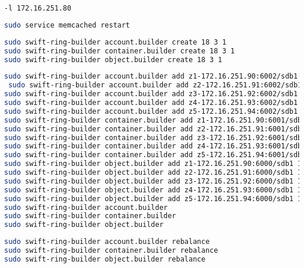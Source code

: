 \begin{lstlisting}[label=memcachedconf, language=Bash, caption=MemCached in /etc/memcached.conf konfigurieren ]
-l 172.16.251.80
\end{lstlisting}

\begin{lstlisting}[label=startMemcached, language=Bash, caption=Memcached starten]
sudo service memcached restart
\end{lstlisting}

\begin{lstlisting}[label=ring_create, language=Bash, caption=Account Container und Object Ring erstellen]
sudo swift-ring-builder account.builder create 18 3 1
sudo swift-ring-builder container.builder create 18 3 1
sudo swift-ring-builder object.builder create 18 3 1
\end{lstlisting}

\begin{lstlisting}[label=ring_add, language=Bash, caption=Server bzw. Speicher den Ringen hinzufügen]
sudo swift-ring-builder account.builder add z1-172.16.251.90:6002/sdb1 100
 sudo swift-ring-builder account.builder add z2-172.16.251.91:6002/sdb1 100
sudo swift-ring-builder account.builder add z3-172.16.251.92:6002/sdb1 100
sudo swift-ring-builder account.builder add z4-172.16.251.93:6002/sdb1 100
sudo swift-ring-builder account.builder add z5-172.16.251.94:6002/sdb1 100
sudo swift-ring-builder container.builder add z1-172.16.251.90:6001/sdb1 100
sudo swift-ring-builder container.builder add z2-172.16.251.91:6001/sdb1 100
sudo swift-ring-builder container.builder add z3-172.16.251.92:6001/sdb1 100
sudo swift-ring-builder container.builder add z4-172.16.251.93:6001/sdb1 100
sudo swift-ring-builder container.builder add z5-172.16.251.94:6001/sdb1 100
sudo swift-ring-builder object.builder add z1-172.16.251.90:6000/sdb1 100
sudo swift-ring-builder object.builder add z2-172.16.251.91:6000/sdb1 100
sudo swift-ring-builder object.builder add z3-172.16.251.92:6000/sdb1 100
sudo swift-ring-builder object.builder add z4-172.16.251.93:6000/sdb1 100
sudo swift-ring-builder object.builder add z5-172.16.251.94:6000/sdb1 100
sudo swift-ring-builder account.builder
sudo swift-ring-builder container.builder
sudo swift-ring-builder object.builder
\end{lstlisting}

\begin{lstlisting}[label=ring_rebalance, language=Bash, caption=Ring rebalance]
sudo swift-ring-builder account.builder rebalance
sudo swift-ring-builder container.builder rebalance
sudo swift-ring-builder object.builder rebalance
\end{lstlisting}

